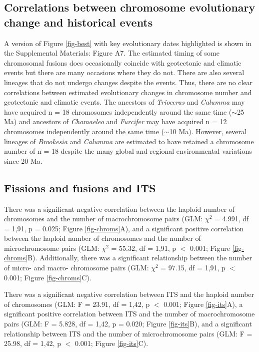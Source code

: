 \documentclass[a4paper, 12pt]{article}
\begin{document}
\subsection{Correlations between chromosome evolutionary change and historical events}
A version of Figure \ref{fig-best} with key evolutionary dates highlighted is shown in the Supplemental Materials: Figure A7.
The estimated timing of some chromosomal fusions does occasionally coincide with geotectonic and climatic events but there are many occasions where they do not. 
There are also several lineages that do not undergo changes despite the events. 
Thus, there are no clear correlations between estimated evolutionary changes in chromosome number and geotectonic and climatic events. 
The ancestors of \textit{Trioceras} and \textit{Calumma} may have acquired n = 18 chromosomes independently around the same time ($\sim$25 Ma) and ancestors of \textit{Chamaeleo} and \textit{Furcifer} may have acquired n = 12 chromosomes independently around the same time ($\sim$10 Ma). 
However, several lineages of \textit{Brookesia} and \textit{Calumma} are estimated to have retained a chromosome number of n = 18 despite the many global and regional environmental variations since 20 Ma. 

\subsection{Fissions and fusions and ITS}
There was a significant negative correlation between the haploid number of chromosomes and the number of macrochromosome pairs (GLM: $\chi^2$ = 4.991, df = 1,91, p = 0.025; Figure \ref{fig-chroms}A), and a significant positive correlation between the haploid number of chromosomes and the number of microchromosome pairs (GLM: $\chi^2$ = 55.32, df = 1,91, p $<$ 0.001; Figure \ref{fig-chroms}B). 
Additionally, there was a significant relationship between the number of micro- and macro- chromosome pairs (GLM: $\chi^2$ = 97.15, df = 1,91, p $<$ 0.001; Figure \ref{fig-chroms}C). 

There was a significant negative correlation between ITS and the haploid number of chromosomes (GLM: F = 23.91, df = 1,42, p $<$ 0.001; Figure \ref{fig-its}A), a significant positive correlation between ITS and the number of macrochromosome pairs (GLM: F = 5.828, df = 1,42, p = 0.020; Figure \ref{fig-its}B), and a significant relationship between ITS and the number of microchromosome pairs (GLM: F = 25.98, df = 1,42, p $<$ 0.001; Figure \ref{fig-its}C). 
\end{document}
